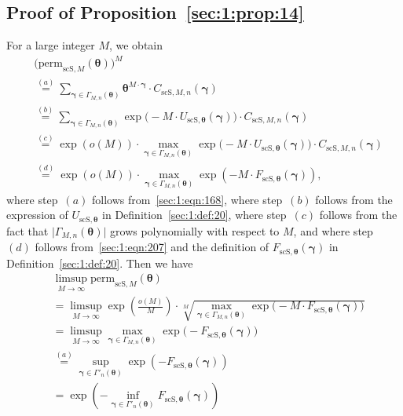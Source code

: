 \documentclass[journal,lettersize,twocolumn]{IEEEtran} %
\newcommand{\vect}[1]{ \bm{#1} }
\newcommand{\vgam}{ \vect{\gamma} }
\newcommand{\matr}[1]{ \bm{#1} }
\newcommand{\permscsM}[1]{ \mathrm{perm}_{\mathrm{scS},#1} }
\newcommand{\CscSgen}[2]{C_{\mathrm{scS},#1,#2}}
\newcommand{\mtheta}{\matr{\theta}}
\newcommand{\vtheta}{\matr{\theta}}
\newcommand{\FscSthe}{F_{ \mathrm{scS}, \mtheta }}
\newcommand{\UscSthe}{U_{ \mathrm{scS}, \mtheta }}
\newcommand{\GamMnthe}{ \Gamma_{M,n}(\vtheta) }
\newcommand{\Gampnthe}{ \Gamma'_{n}(\vtheta) }
\begin{document}
\begin{appendices}

%
%

%

\section{Proof of Proposition~\ref{sec:1:prop:14}}
\label{apx:24}

%

For a large integer $M$, we obtain
\begin{align*}
  &\bigl( \permscsM{M}(\mtheta) \bigr)^{M} \\
  &\overset{(a)}{=}
     \sum_{ \vgam \in \GamMnthe }
       \mtheta^{ M \cdot \vgam } \cdot \CscSgen{M}{n}( \vgam ) \\
  &\overset{(b)}{=}  \sum_{ \vgam \in \GamMnthe }
      \exp\bigl( - M \cdot \UscSthe(\vgam) \bigr)
      \cdot
      \CscSgen{M}{n}( \vgam ) \\
  &\overset{(c)}{=}  
    \exp( o(M) ) \cdot \!
    \max_{ \vgam \in \GamMnthe }
      \exp\bigl( - M \cdot \UscSthe(\vgam) \bigr)
      \cdot
      \CscSgen{M}{n}(\vgam)
    \nonumber \\
  &\overset{(d)}{=}  
    \exp( o(M) ) \cdot 
    \max_{ \vgam \in \GamMnthe } \exp( - M \cdot \FscSthe(\vgam) ),
\end{align*}
where step~$(a)$ follows from~\eqref{sec:1:eqn:168}, where step~$(b)$ follows
from the expression of $ \UscSthe $ in Definition~\ref{sec:1:def:20}, where
step~$(c)$ follows from the fact that $ \bigl| \GamMnthe \bigr| $ grows
polynomially with respect to $ M $, and where step~$(d)$ follows
from~\eqref{sec:1:eqn:207} and the definition of $\FscSthe(\vgam)$ in
Definition~\ref{sec:1:def:20}. Then we have
\begin{align*}
  &\limsup_{M \to \infty}
     \permscsM{M}(\mtheta) \\
  &= \limsup_{M \to \infty} 
       \exp\left( \frac{o(M)}{M} \right)
       \cdot
       \sqrt[M]{\max_{ \vgam \in \GamMnthe } 
                    \exp\bigl( - M \cdot \FscSthe(\vgam) \bigr)} \\
  &= \limsup_{M \to \infty} 
       \max_{ \vgam \in \GamMnthe } 
         \exp\bigl( - \FscSthe(\vgam) \bigr) \\
  &\overset{(a)}{=}
     \sup_{ \vgam \in \Gampnthe } 
       \exp( - \FscSthe(\vgam) ) \\
  &= \exp
       \left(
         -
         \inf_{ \vgam \in \Gampnthe }
           \FscSthe(\vgam)
       \right) \\

\end{align*}
\end{appendices}
\end{document}

